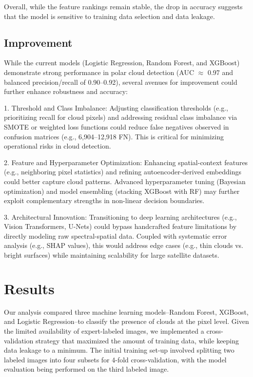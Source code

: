 \documentclass[11pt,letterpaper]{article}
\begin{document}
Overall, while the feature rankings remain stable, the drop in accuracy suggests that the model is sensitive to training data selection and data leakage.






\vspace{1em} %
\subsection{Improvement}
\vspace{0.5em} %

While the current models (Logistic Regression, Random Forest, and XGBoost) demonstrate strong performance in polar cloud detection (AUC $\approx$ 0.97 and balanced precision/recall of 0.90–0.92), several avenues for improvement could further enhance robustness and accuracy:

1. Threshold and Class Imbalance: Adjusting classification thresholds (e.g., prioritizing recall for cloud pixels) and addressing residual class imbalance via SMOTE or weighted loss functions could reduce false negatives observed in confusion matrices (e.g., 6,904–12,918 FN). This is critical for minimizing operational risks in cloud detection.

2. Feature and Hyperparameter Optimization: Enhancing spatial-context features (e.g., neighboring pixel statistics) and refining autoencoder-derived embeddings could better capture cloud patterns. Advanced hyperparameter tuning (Bayesian optimization) and model ensembling (stacking XGBoost with RF) may further exploit complementary strengths in non-linear decision boundaries.

3. Architectural Innovation: Transitioning to deep learning architectures (e.g., Vision Transformers, U-Nets) could bypass handcrafted feature limitations by directly modeling raw spectral-spatial data. Coupled with systematic error analysis (e.g., SHAP values), this would address edge cases (e.g., thin clouds vs. bright surfaces) while maintaining scalability for large satellite datasets.

\newpage
\section{Results}
Our analysis compared three machine learning models--Random Forest, XGBoost, and Logistic Regression--to classify the presence of clouds at the pixel level. Given the limited availability of expert-labeled images, we implemented a cross-validation strategy that maximized the amount of training data, while keeping data leakage to a minimum. The initial training set-up involved splitting two labeled images into four subsets for 4-fold cross-validation, with the model evaluation being performed on the third labeled image.
\end{document}
